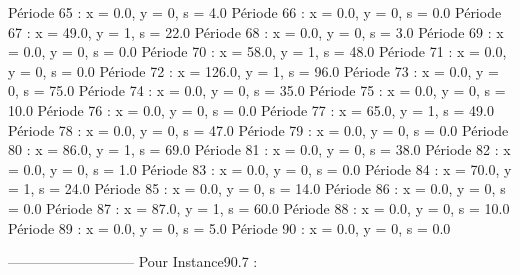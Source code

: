 Période 65 : x = 0.0, y = 0, s = 4.0
Période 66 : x = 0.0, y = 0, s = 0.0
Période 67 : x = 49.0, y = 1, s = 22.0
Période 68 : x = 0.0, y = 0, s = 3.0
Période 69 : x = 0.0, y = 0, s = 0.0
Période 70 : x = 58.0, y = 1, s = 48.0
Période 71 : x = 0.0, y = 0, s = 0.0
Période 72 : x = 126.0, y = 1, s = 96.0
Période 73 : x = 0.0, y = 0, s = 75.0
Période 74 : x = 0.0, y = 0, s = 35.0
Période 75 : x = 0.0, y = 0, s = 10.0
Période 76 : x = 0.0, y = 0, s = 0.0
Période 77 : x = 65.0, y = 1, s = 49.0
Période 78 : x = 0.0, y = 0, s = 47.0
Période 79 : x = 0.0, y = 0, s = 0.0
Période 80 : x = 86.0, y = 1, s = 69.0
Période 81 : x = 0.0, y = 0, s = 38.0
Période 82 : x = 0.0, y = 0, s = 1.0
Période 83 : x = 0.0, y = 0, s = 0.0
Période 84 : x = 70.0, y = 1, s = 24.0
Période 85 : x = 0.0, y = 0, s = 14.0
Période 86 : x = 0.0, y = 0, s = 0.0
Période 87 : x = 87.0, y = 1, s = 60.0
Période 88 : x = 0.0, y = 0, s = 10.0
Période 89 : x = 0.0, y = 0, s = 5.0
Période 90 : x = 0.0, y = 0, s = 0.0

---------------------------
Pour Instance90.7  :

